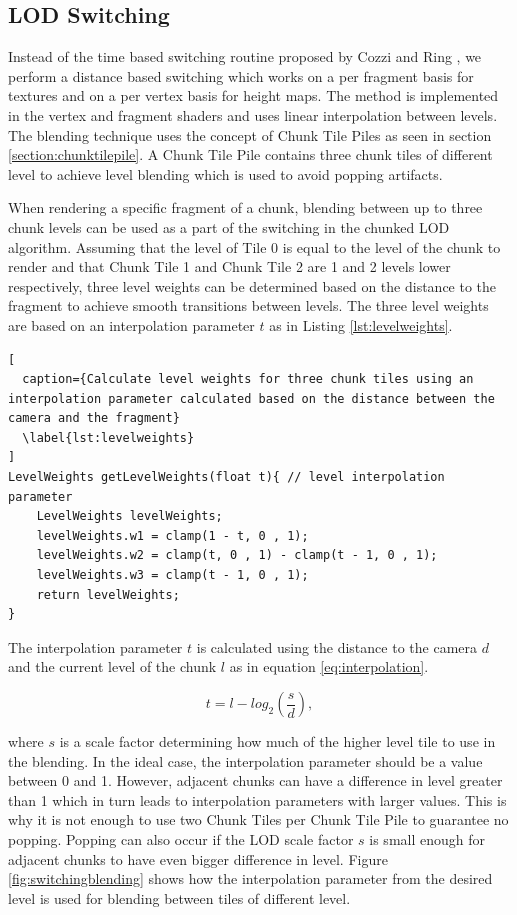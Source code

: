 \subsection{LOD Switching}
\label{section:lodswitching}
Instead of the time based switching routine proposed by Cozzi and Ring \cite{cozzi11}, we perform a distance based switching which works on a per fragment basis for textures and on a per vertex basis for height maps. The method is implemented in the vertex and fragment shaders and uses linear interpolation between levels. The blending technique uses the concept of Chunk Tile Piles as seen in section \ref{section:chunktilepile}. A Chunk Tile Pile contains three chunk tiles of different level to achieve level blending which is used to avoid popping artifacts. 

When rendering a specific fragment of a chunk, blending between up to three chunk levels can be used as a part of the switching in the chunked LOD algorithm. Assuming that the level of Tile 0 is equal to the level of the chunk to render and that Chunk Tile 1 and Chunk Tile 2 are 1 and 2 levels lower respectively, three level weights can be determined based on the distance to the fragment to achieve smooth transitions between levels. The three level weights are based on an interpolation parameter $t$ as in Listing \ref{lst:levelweights}.

\begin{lstlisting}[
  caption={Calculate level weights for three chunk tiles using an interpolation parameter calculated based on the distance between the camera and the fragment}
  \label{lst:levelweights}
]
LevelWeights getLevelWeights(float t){ // level interpolation parameter
	LevelWeights levelWeights;
	levelWeights.w1 = clamp(1 - t, 0 , 1);
	levelWeights.w2 = clamp(t, 0 , 1) - clamp(t - 1, 0 , 1);
	levelWeights.w3 = clamp(t - 1, 0 , 1);
	return levelWeights;
}
\end{lstlisting}

The interpolation parameter $t$ is calculated using the distance to the camera $d$ and the current level of the chunk $l$ as in equation \ref{eq:interpolation}.

\begin{equation}
\label{eq:interpolation}
t = l-log_2(\frac{s}{d}),
\end{equation}

where $s$ is a scale factor determining how much of the higher level tile to use in the blending. In the ideal case, the interpolation parameter should be a value between 0 and 1. However, adjacent chunks can have a difference in level greater than 1 which in turn leads to interpolation parameters with larger values. This is why it is not enough to use two Chunk Tiles per Chunk Tile Pile to guarantee no popping. Popping can also occur if the LOD scale factor $s$ is small enough for adjacent chunks to have even bigger difference in level. Figure \ref{fig:switchingblending} shows how the interpolation parameter from the desired level is used for blending between tiles of different level.

